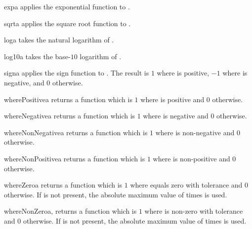 \begin{funcdesc}{exp}{a}
applies the exponential function to .
\end{funcdesc}

\begin{funcdesc}{sqrt}{a}
applies the square root function to .
\end{funcdesc}

\begin{funcdesc}{log}{a}
takes the natural logarithm of .
\end{funcdesc}

\begin{funcdesc}{log10}{a}
takes the base-$10$ logarithm of .
\end{funcdesc}

\begin{funcdesc}{sign}{a}
applies the sign function to . The result is $1$ where  is
positive, $-1$ where  is negative, and $0$ otherwise.
\end{funcdesc}

\begin{funcdesc}{wherePositive}{a}
returns a function which is $1$ where  is positive and $0$ otherwise.
\end{funcdesc}

\begin{funcdesc}{whereNegative}{a}
returns a function which is $1$ where  is negative and $0$ otherwise.
\end{funcdesc}

\begin{funcdesc}{whereNonNegative}{a}
returns a function which is $1$ where  is non-negative and $0$ otherwise.
\end{funcdesc}

\begin{funcdesc}{whereNonPositive}{a}
returns a function which is $1$ where  is non-positive and $0$ otherwise.
\end{funcdesc}

\begin{funcdesc}{whereZero}{a}
returns a function which is $1$ where  equals zero with tolerance
 and $0$ otherwise. If  is not present, the absolute maximum
value of  times  is used.
\end{funcdesc}

\begin{funcdesc}{whereNonZero}{a, }
returns a function which is $1$ where  is non-zero with tolerance
 and $0$ otherwise. If  is not present, the absolute maximum
value of  times  is used.
\end{funcdesc}

